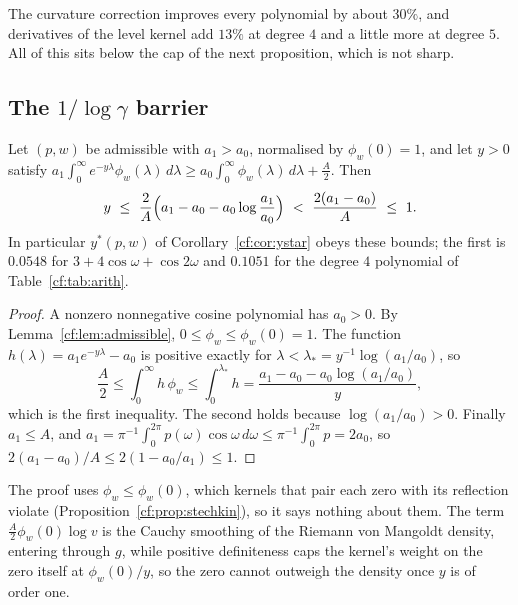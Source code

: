The curvature correction improves every polynomial by about $30\%$, and derivatives of the level kernel add $13\%$ at degree $4$ and a little more at degree $5$. All of this sits below the cap of the next proposition, which is not sharp.

\subsection{The $1/\log\gamma$ barrier}

\begin{proposition}\label{cf:prop:barrier2}
Let $(p,w)$ be admissible with $a_1>a_0$, normalised by $\phi_w(0)=1$, and let $y>0$ satisfy $a_1\int_0^\infty e^{-y\lambda}\phi_w(\lambda)\,d\lambda\ge a_0\int_0^\infty\phi_w(\lambda)\,d\lambda+\frac A2$. Then
\[
y\ \le\ \frac2A\Bigl(a_1-a_0-a_0\log\frac{a_1}{a_0}\Bigr)\ <\ \frac{2(a_1-a_0)}A\ \le\ 1 .
\]
In particular $y^\ast(p,w)$ of Corollary~\ref{cf:cor:ystar} obeys these bounds; the first is $0.0548$ for $3+4\cos\omega+\cos2\omega$ and $0.1051$ for the degree $4$ polynomial of Table~\ref{cf:tab:arith}.
\end{proposition}

\begin{proof}
A nonzero nonnegative cosine polynomial has $a_0>0$. By Lemma~\ref{cf:lem:admissible}, $0\le\phi_w\le\phi_w(0)=1$. The function $h(\lambda)=a_1e^{-y\lambda}-a_0$ is positive exactly for $\lambda<\lambda_\ast=y^{-1}\log(a_1/a_0)$, so
\[
\frac A2\le\int_0^\infty h\,\phi_w\le\int_0^{\lambda_\ast}h=\frac{a_1-a_0-a_0\log(a_1/a_0)}y,
\]
which is the first inequality. The second holds because $\log(a_1/a_0)>0$. Finally $a_1\le A$, and $a_1=\pi^{-1}\int_0^{2\pi}p(\omega)\cos\omega\,d\omega\le\pi^{-1}\int_0^{2\pi}p=2a_0$, so $2(a_1-a_0)/A\le2(1-a_0/a_1)\le1$.
\end{proof}

The proof uses $\phi_w\le\phi_w(0)$, which kernels that pair each zero with its reflection violate (Proposition~\ref{cf:prop:stechkin}), so it says nothing about them. The term $\frac A2\phi_w(0)\log v$ is the Cauchy smoothing of the Riemann von Mangoldt density, entering through $g$, while positive definiteness caps the kernel's weight on the zero itself at $\phi_w(0)/y$, so the zero cannot outweigh the density once $y$ is of order one.

